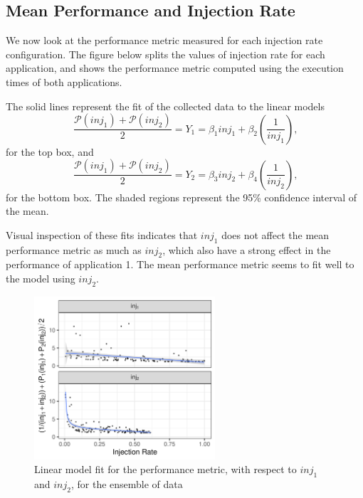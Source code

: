 \documentclass[a4paper]{article}
\begin{document}
\subsection{Mean Performance and Injection Rate}
\label{sec:org05af407}
We  now  look  at  the  performance metric  measured  for  each  injection  rate
configuration.  The  figure below splits the  values of injection rate  for each
application, and shows the performance metric computed using the execution times
of both applications.

The solid lines represent the fit of the collected data to the linear models
\begin{equation*}
\dfrac{\mathcal{P}(inj_1) + \mathcal{P}(inj_2)}{2} =
Y_1 = \beta_{1}inj_1 +
\beta_{2}\left(\dfrac{1}{inj_1}\right)\text{,}
\end{equation*}
for the top box, and
\begin{equation*}
\dfrac{\mathcal{P}(inj_1) + \mathcal{P}(inj_2)}{2} =
Y_2 = \beta_{3}inj_2 +
\beta_{4}\left(\dfrac{1}{inj_2}\right)\text{,}
\end{equation*}
for the bottom box. The shaded  regions represent the 95\% confidence interval of
the mean.

Visual inspection of  these fits indicates that \(inj_1\) does  not affect the mean
performance metric  as much as  \(inj_2\), which also have  a strong effect  in the
performance of application  1. The mean performance metric seems  to fit well to
the model using \(inj_2\).

\begin{figure}[h]
\centering
\includegraphics[width=0.6\textwidth]{./img/2_apps_min_mean_time/rs_20_samples_10_iterations_scatter_weighted_full.pdf}
\caption{Linear model fit for the performance metric, with respect to \(inj_1\) and \(inj_2\), for the ensemble of data}
\end{figure}
\end{document}
